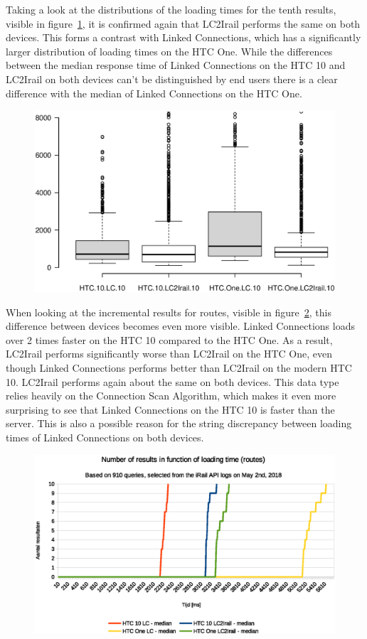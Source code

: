 \documentclass[twocolumn]{phdsymp} %
\begin{document}
Taking a look at the distributions of the loading times for the tenth results, visible in figure~\ref{fig:liveboardboxplot}, it is confirmed again that LC2Irail performs the same on both devices. This forms a contrast with Linked Connections, which has a significantly larger distribution of loading times on the HTC One. While the differences between the median response time of Linked Connections on the HTC 10 and LC2Irail on both devices can't be distinguished by end users %
there is a clear difference with the median of Linked Connections on the HTC One.

\begin{figure}[ht]
	\begin{center}
		\includegraphics[trim=3cm 4cm 0 0, width=.50\textwidth]{images/boxplot_liveboards_10.eps}
		\caption{\label{fig:liveboardboxplot} }
	\end{center}
\end{figure}

When looking at the incremental results for routes, visible in figure~\ref{fig:route}, this difference between devices becomes even more visible. Linked Connections loads over 2 times faster on the HTC 10 compared to the HTC One. As a result, LC2Irail performs significantly worse than LC2Irail on the HTC One, even though Linked Connections performs better than LC2Irail on the modern HTC 10. LC2Irail performs again about the same on both devices.  This data type relies heavily on the Connection Scan Algorithm, which makes it even more surprising to see that Linked Connections on the HTC 10 is faster than the server. This is also a possible reason for the string discrepancy between loading times of Linked Connections on both devices.

\begin{figure}[ht]
	\begin{center}
		\includegraphics[width=.50\textwidth]{images/dief_routes_average.eps}
		\caption{\label{fig:route} }
	\end{center}
\end{figure}
\end{document}
